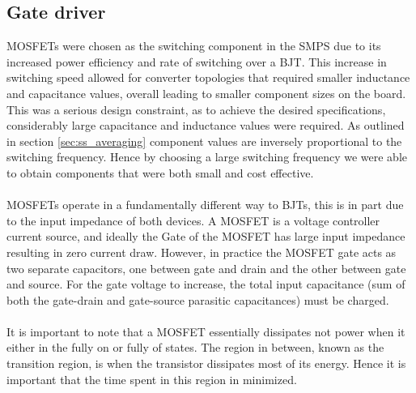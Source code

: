 \subsection{Gate driver}
\begin{figure}[H]
\centering
{}
\caption{}
\label{}
\end{figure}
MOSFETs were chosen as the switching component in the SMPS due to its increased power efficiency and rate of switching over a BJT. This increase in switching speed allowed for converter topologies that required smaller inductance and capacitance values, overall leading to smaller component sizes on the board. This was a serious design constraint, as to achieve the desired specifications, considerably large capacitance and inductance values were required. As outlined in section \ref{sec:ss_averaging} component values are inversely proportional to the switching frequency. Hence by choosing a large switching frequency we were able to obtain components that were both small and cost effective.
\\ \\
MOSFETs operate in a fundamentally different way to BJTs, this is in part due to the input impedance of both devices. A MOSFET is a voltage controller current source, and ideally the Gate of the MOSFET has large input impedance resulting in zero current draw. However, in practice the MOSFET gate acts as two separate capacitors, one between gate and drain and the other between gate and source. For the gate voltage to increase, the total input capacitance (sum of both the gate-drain and gate-source parasitic capacitances) must be charged. 
\\ \\
It is important to note that a MOSFET essentially dissipates not power when it either in the fully on or fully of states. The region in between, known as the transition region, is when the transistor dissipates most of its energy. Hence it is important that the time spent in this region in minimized.
\\ \\
